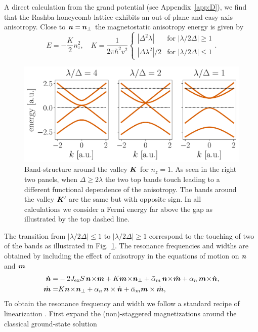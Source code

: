 A direct calculation from the grand potential (see Appendix~\ref{app:D}), we find that the Rashba honeycomb lattice exhibits an out-of-plane and easy-axis anisotropy. Close to $\boldsymbol{n}=\boldsymbol{n}_\perp$ the magnetostatic anisotropy energy is given by
\begin{equation}
    E = -\frac{K}{2}n_z^2, \quad K= \frac{1}{2\pi\hbar^2v^2}\begin{cases}
    |\Delta^2\lambda|  &  \text{for } |\lambda/2\Delta| \geq 1 \\
    |\Delta\lambda^2|/2  &  \text{for } |\lambda/2\Delta| \leq 1
    \end{cases}.
\end{equation}
\begin{figure}
    \centering
    \includegraphics[width=0.75\linewidth]{gfx/fig2_new.pdf}
    \caption{Band-structure around the valley $\boldsymbol{K}$ for $n_z=1$. As seen in the right two panels, when $\Delta\geq2\lambda$ the two top bands touch leading to a different functional dependence of the anisotropy. The bands around the valley $\boldsymbol{K}'$ are the same but with opposite sign. In all calculations we consider a Fermi energy far above the gap as illustrated by the top dashed line.  }
    \label{fig:bands}
\end{figure}
The transition from $|\lambda/2\Delta|\le1$ to $|\lambda/2\Delta|\ge1$ correspond to the touching of two of the bands as illustrated in Fig.~\ref{fig:bands}. The resonance frequencies and widths are obtained by including the effect of anisotropy in the equations of motion on $\boldsymbol{n}$ and $\boldsymbol{m}$
\beml
\label{AFMEOM2}
\begin{align}
\label{ndot2}
\dot{\bb{n}} = &  -2J_\text{ex}S\, \bb{n}\!\times\!\bb{m} +K \bb{m}\!\times\!\bb{n}_\perp+\bar{\alpha}_m\,\bb{n}\!\times\!\dot{\bb{m}}+\alpha_n\,\bb{m}\!\times\! \dot{\bb{n}},\\
\label{mdot2}
\dot{\bb{m}} = & K  \bb{n}\!\times\!\bb{n}_\perp+\alpha_n\,\bb{n} \times \dot{\bb{n}}+\bar{\alpha}_m \bb{m} \times \dot{\bb{m}} ,
\end{align}
\eml
To obtain the resonance frequency and width we follow a standard recipe of linearization \cite{keffer_theory_1952}. First expand the (non)-staggered magnetizations around the classical ground-state solution

